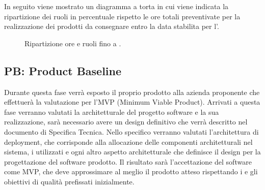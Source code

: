 \begin{table}[H]
    \centering
    \caption{Ripartizione ore e costi fino .}
    \label{tab:stima_costi_RTB} 
\end{table}

In seguito viene mostrato un diagramma a torta in cui viene indicata la ripartizione dei ruoli in percentuale rispetto le ore totali preventivate per la realizzazione dei prodotti da consegnare entro la data stabilita per l'.

\begin{figure}[H]
    \centering
    \caption{Ripartizione ore e ruoli fino a .}
    \label{fig:pie_ruoli_RTB}
\end{figure}

\subsection{PB: Product Baseline}
Durante questa fase verrà esposto il proprio prodotto alla azienda proponente che effettuerà la valutazione per l'MVP (Minimum Viable Product).
Arrivati a questa fase verranno valutati la  architetturale del progetto software e la sua realizzazione, sarà necessario avere un design definitivo 
che verrà descritto nel documento di Specifica Tecnica.
Nello specifico verranno valutati l'architettura di deployment, che corrisponde alla allocazione delle componenti architetturali nel sistema, 
i  utilizzati e ogni altro aspetto architetturale che definisce il design per la progettazione del software prodotto.
Il risultato sarà l'accettazione del software come MVP, che deve approssimare al meglio il prodotto atteso rispettando i  
e gli obiettivi di qualità prefissati inizialmente.